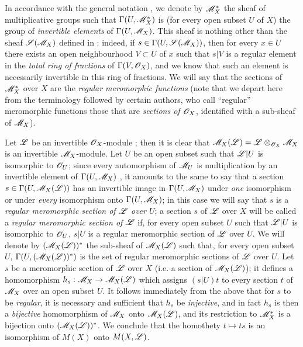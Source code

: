 \begin{env}[20.1.8]\label{IV.20.1.8}
In accordance with the general notation , we denote by $\mathscr{M}_X^*$ the sheaf of multiplicative groups such that $\Gamma(U,\mathscr{M}_X^*)$ is (for every open subset $U$ of $X$) the group of \emph{invertible elements} of $\Gamma(U,\mathscr{M}_X)$.
This sheaf is nothing other than the sheaf $\mathscr{S}(\mathscr{M}_X)$ defined in : indeed, if $s\in\Gamma(U,\mathscr{S}(\mathscr{M}_X))$, then for every $x\in U$ there exists an open neighbourhood $V\subset U$ of $x$ such that $s|V$ is a regular element in the \emph{total ring of fractions} of $\Gamma(V,\mathscr{O}_X)$, and we know that such an element is necessarily invertible in this ring of fractions.
We will say that the sections of $\mathscr{M}_X^*$ over $X$ are the \emph{regular meromorphic functions} (note that we depart here from the terminology followed by certain authors, who call ``regular'' meromorphic functions those that are \emph{sections of $\mathscr{O}_X$}, identified with a sub-sheaf of $\mathscr{M}_X$).

Let $\mathscr{L}$ be an invertible $\mathscr{O}_X$-module ; then it is clear that $\mathscr{M}_X(\mathscr{L})=\mathscr{L}\otimes_{\mathscr{O}_X}\mathscr{M}_X$
is an invertible $\mathscr{M}_X$-module.
Let $U$ be an open subset such that $\mathscr{L}|U$ is isomorphic to $\mathscr{O}_U$; since every automorphism of $\mathscr{M}_U$ is multiplication by an invertible element of $\Gamma(U,\mathscr{M}_X)$ , it amounts to the same to say that a section $s\in\Gamma(U,\mathscr{M}_X(\mathscr{L}))$ has an invertible image in $\Gamma(U,\mathscr{M}_X)$ under \emph{one} isomorphism or under \emph{every} isomorphism onto $\Gamma(U,\mathscr{M}_X)$; in this case we will say that $s$ is a \emph{regular meromorphic section of $\mathscr{L}$ over $U$}; a section $s$ of $\mathscr{L}$ over $X$ will be called a \emph{regular meromorphic section of $\mathscr{L}$} if, for every open subset $U$ such that $\mathscr{L}|U$ is isomorphic to $\mathscr{O}_U$, $s|U$ is a regular meromorphic section of $\mathscr{L}$ over $U$.
We will denote by $(\mathscr{M}_X(\mathscr{L}))^*$ the sub-sheaf of $\mathscr{M}_X(\mathscr{L})$ such that, for every open subset $U$, $\Gamma(U,(\mathscr{M}_X(\mathscr{L}))^*)$ is the set of regular meromorphic sections of $\mathscr{L}$ over $U$.
Let $s$ be a meromorphic section of $\mathscr{L}$ over $X$ (i.e. a section of $\mathscr{M}_X(\mathscr{L})$); it defines a homomorphism $h_s:\mathscr{M}_X\to\mathscr{M}_X(\mathscr{L})$ which assigns $(s|U)t$ to every section $t$ of $\mathscr{M}_X$ over an open subset $U$.
It follows immediately from the above that for $s$ to be \emph{regular}, it is necessary and sufficient that $h_s$ be \emph{injective}, and in fact $h_s$ is then a \emph{bijective} homomorphism of $\mathscr{M}_X$ onto $\mathscr{M}_X(\mathscr{L})$, and its restriction to $\mathscr{M}_X^*$ is a bijection onto $(\mathscr{M}_X(\mathscr{L}))^*$.
We conclude that the homothety $t\mapsto ts$ is an isomorphism of $M(X)$ onto $M(X,\mathscr{L})$.
\end{env}

